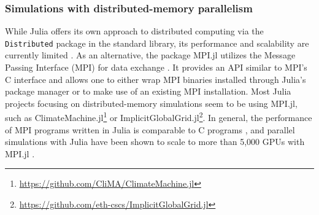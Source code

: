 \documentclass[hidelinks]{juliacon} %
\begin{document}
\subsubsection{Simulations with distributed-memory parallelism}
\label{sec:distributed-memory}

While Julia offers its own approach to distributed computing via the \lstinline{Distributed} package
in the standard library, its performance and scalability are currently limited \cite{byrne2021mpi}.
As an alternative, the package MPI.jl utilizes the Message Passing Interface (MPI) for data
exchange \cite{byrne2021mpi}. It provides an API similar to MPI's C interface and allows one to either
wrap MPI binaries installed through Julia's package manager or to make use of an existing MPI
installation.  Most Julia projects focusing on distributed-memory simulations seem to be using
MPI.jl, such as ClimateMachine.jl\footnote{\url{https://github.com/CliMA/ClimateMachine.jl}} or
ImplicitGlobalGrid.jl\footnote{\url{https://github.com/eth-cscs/ImplicitGlobalGrid.jl}}.  In
general, the performance of MPI programs written in Julia is comparable to C programs
\cite{hunold2020benchmarking}, and parallel simulations with Julia have been shown to scale
to more than 5{,}000 GPUs with MPI.jl \cite{omlin2020solving}.
\end{document}

